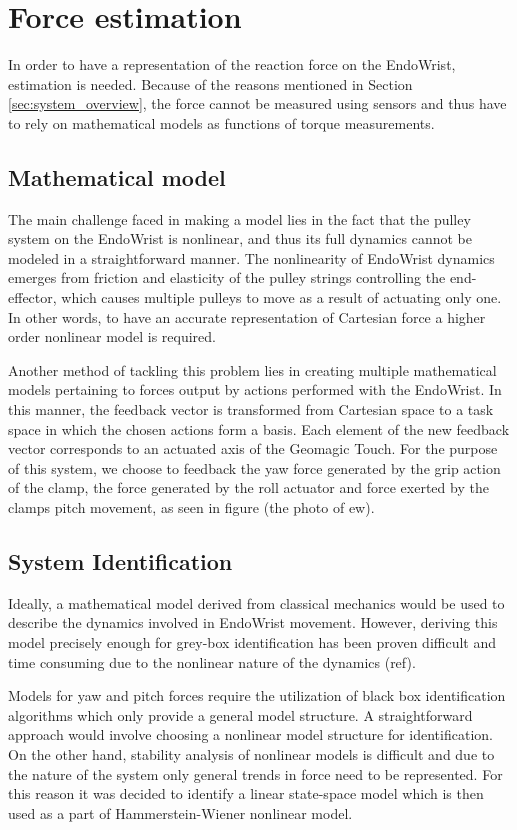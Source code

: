 \section{Force estimation}\label{sec:force_estimation}
In order to have a representation of the reaction force on the EndoWrist, estimation is needed.
Because of the reasons mentioned in Section \ref{sec:system_overview}, the force cannot be measured using sensors and thus have to rely on mathematical models as functions of torque measurements.

\subsection{Mathematical model}
The main challenge faced in making a model lies in the fact that the pulley system on the EndoWrist is nonlinear, and thus its full dynamics cannot be modeled in a straightforward manner. 
The nonlinearity of EndoWrist dynamics emerges from friction and elasticity of the pulley strings controlling the end-effector, which causes multiple pulleys to move as a result of actuating only one. 
In other words, to have an accurate representation of Cartesian force a higher order nonlinear model is required.

Another method of tackling this problem lies in creating multiple mathematical models pertaining to forces output by actions performed with the EndoWrist.
In this manner, the feedback vector is transformed from Cartesian space to a task space in which the chosen actions form a basis.
Each element of the new feedback vector corresponds to an actuated axis of the Geomagic Touch.
For the purpose of this system, we choose to feedback the yaw force generated by the grip action of the clamp, the force generated by the roll actuator and force exerted by the clamps pitch movement, as seen in figure (the photo of ew).

\subsection{System Identification}
Ideally, a mathematical model derived from classical mechanics would be used to describe the dynamics involved in EndoWrist movement.
However, deriving this model precisely enough for grey-box identification has been proven difficult and time consuming due to the nonlinear nature of the dynamics (ref).


Models for yaw and pitch forces require the utilization of black box identification algorithms which only provide a general model structure. 
A straightforward approach would involve choosing a nonlinear model structure for identification.
On the other hand, stability analysis of nonlinear models is difficult and due to the nature of the system only general trends in force need to be represented.
For this reason it was decided to identify a linear state-space model which is then used as a part of Hammerstein-Wiener nonlinear model.

